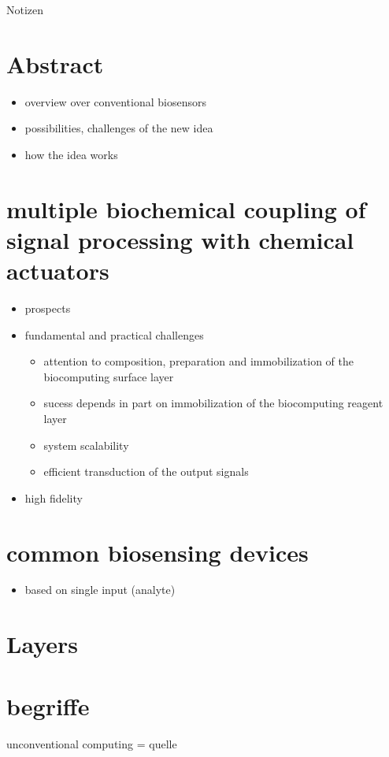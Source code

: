 \documentclass[12pt]{article}
\begin{document}
\large{Notizen}\\

\section{Abstract}
\begin{itemize}
	\item overview over conventional biosensors
	\item possibilities, challenges of the new idea
	\item how the idea works
\end{itemize}

\section{multiple biochemical coupling of signal processing with chemical actuators}
\begin{itemize}
	\item prospects
	\item fundamental and practical challenges
	\begin{itemize}
		\item attention to composition, preparation and immobilization of the biocomputing surface layer
		\item sucess depends in part on immobilization of the biocomputing reagent layer
		\item system scalability 
		\item efficient transduction of the output signals
	\end{itemize}
\item high fidelity

\end{itemize}

\section{common biosensing devices}
\begin{itemize}
	\item based on single input (analyte)
\end{itemize}

\section{Layers}
\section{begriffe}
unconventional computing = quelle
\end{document}
